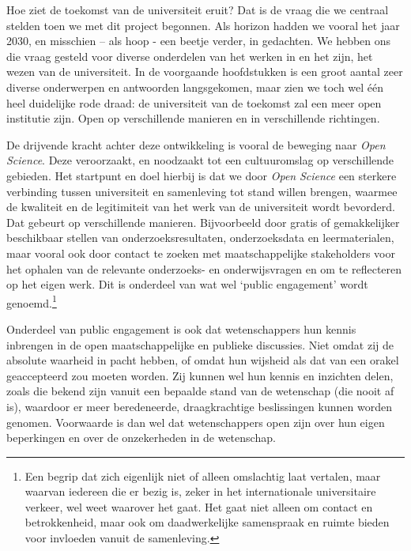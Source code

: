 \documentclass[smallauthor, chapterhaspagenum, nochapterinheader, pagenuminheader,  bigchapnum,medium2, tocpages,  garamond, titleinheader]{jote-book}
\begin{document}
	\nochapterinheader



	Hoe ziet de toekomst van de universiteit eruit? Dat is de vraag die we centraal stelden toen we met dit project begonnen. Als horizon hadden we vooral het jaar 2030, en misschien -- als hoop - een beetje verder, in gedachten. We hebben ons die vraag gesteld voor diverse onderdelen van het werken in en het zijn, het wezen van de universiteit. In de voorgaande hoofdstukken is een groot aantal zeer diverse onderwerpen en antwoorden langsgekomen, maar zien we toch wel één heel duidelijke rode draad: de universiteit van de toekomst zal een meer open institutie zijn. Open op verschillende manieren en in verschillende richtingen.



	De drijvende kracht achter deze ontwikkeling is vooral de beweging naar \emph{Open }\emph{Science}. Deze veroorzaakt, en noodzaakt tot een cultuuromslag op verschillende gebieden. Het startpunt en doel hierbij is dat we door \emph{Open }\emph{Science} een sterkere verbinding tussen universiteit en samenleving tot stand willen brengen, waarmee de kwaliteit en de legitimiteit van het werk van de universiteit wordt bevorderd. Dat gebeurt op verschillende manieren. Bijvoorbeeld door gratis of gemakkelijker beschikbaar stellen van onderzoeksresultaten, onderzoeksdata en leermaterialen, maar vooral ook door contact te zoeken met maatschappelijke stakeholders voor het ophalen van de relevante onderzoeks- en onderwijsvragen en om te reflecteren op het eigen werk. Dit is onderdeel van wat wel ‘public engagement' wordt genoemd.\footnote{Een begrip dat zich eigenlijk niet of alleen omslachtig laat vertalen, maar waarvan iedereen die er bezig is, zeker in het internationale universitaire verkeer, wel weet waarover het gaat. Het gaat niet alleen om contact en betrokkenheid, maar ook om daadwerkelijke samenspraak en ruimte bieden voor invloeden vanuit de samenleving.}



	Onderdeel van public engagement is ook dat wetenschappers hun kennis inbrengen in de open maatschappelijke en publieke discussies. Niet omdat zij de absolute waarheid in pacht hebben, of omdat hun wijsheid als dat van een orakel geaccepteerd zou moeten worden. Zij kunnen wel hun kennis en inzichten delen, zoals die bekend zijn vanuit een bepaalde stand van de wetenschap (die nooit af is), waardoor er meer beredeneerde, draagkrachtige beslissingen kunnen worden genomen. Voorwaarde is dan wel dat wetenschappers open zijn over hun eigen beperkingen en over de onzekerheden in de wetenschap.
\end{document}
